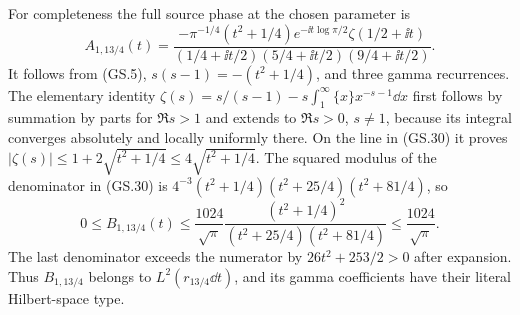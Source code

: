 For completeness the full source phase at the chosen parameter is
\begin{equation}
 A_{1,13/4}(t)=
 \frac{-\pi^{-1/4}(t^2+1/4)e^{-\ii t\log\pi/2}
                \zeta(1/2+\ii t)}
 {(1/4+\ii t/2)(5/4+\ii t/2)(9/4+\ii t/2)}.\tag{GS.30}
\end{equation}
It follows from (GS.5), $s(s-1)=-(t^2+1/4)$, and three gamma
recurrences. The elementary identity
$\zeta(s)=s/(s-1)-s\int_1^\infty\{x\}x^{-s-1}\dd x$
first follows by summation by parts for $\Re s>1$ and extends to
$\Re s>0$, $s\ne1$, because its integral converges absolutely
and locally uniformly there. On the line in (GS.30) it proves
$|\zeta(s)|\le1+2\sqrt{t^2+1/4}\le4\sqrt{t^2+1/4}$.
The squared modulus of the denominator in (GS.30) is
$4^{-3}(t^2+1/4)(t^2+25/4)(t^2+81/4)$, so
\begin{equation}
 0\le B_{1,13/4}(t)
 \le\frac{1024}{\sqrt\pi}
       \frac{(t^2+1/4)^2}{(t^2+25/4)(t^2+81/4)}
 \le\frac{1024}{\sqrt\pi}.\tag{GS.31}
\end{equation}
The last denominator exceeds the numerator by
$26t^2+253/2>0$ after expansion. Thus $B_{1,13/4}$ belongs to
$L^2(r_{13/4}\dd t)$, and its gamma coefficients have their
literal Hilbert-space type.

